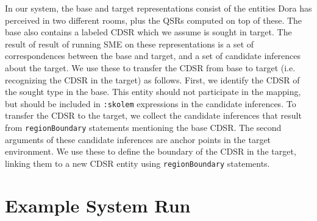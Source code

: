 \documentclass[letterpaper]{article}
\newcommand{\fw}[1]{\texttt{#1}}
\begin{document}
In our system, the base and target representations consist of the entities Dora has perceived in two different rooms, plus the QSRs computed on top of these. The base also contains a labeled CDSR which we assume is sought in target. The result of result of running SME on these representations is a set of correspondences between the base and target, and a set of candidate inferences about the target. We use these to transfer the CDSR from base to target (i.e. recognizing the CDSR in the target) as follows. First, we identify the CDSR of the sought type in the base. This entity should not participate in the mapping, but should be included in \fw{:skolem} expressions in the candidate inferences. To transfer the CDSR to the target, we collect the candidate inferences that result from \fw{regionBoundary} statements mentioning the base CDSR. The second arguments of these candidate inferences are anchor points in the target environment. We use these to define the boundary of the CDSR in the target, linking them to a new CDSR entity using \fw{regionBoundary} statements. 

\section{Example System Run}\label{sec:example}


\end{document}
